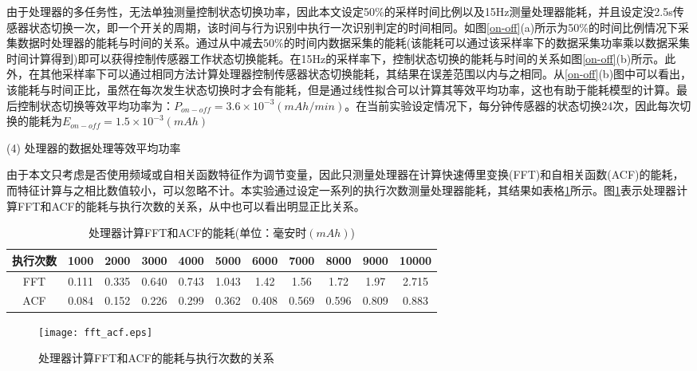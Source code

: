 \par 由于处理器的多任务性，无法单独测量控制状态切换功率，因此本文设定50\%的采样时间比例以及15Hz测量处理器能耗，并且设定没2.5s传感器状态切换一次，即一个开关的周期，该时间与行为识别中执行一次识别判定的时间相同。如图\ref{on-off}(a)所示为50\%的时间比例情况下采集数据时处理器的能耗与时间的关系。通过从中减去50\%的时间内数据采集的能耗(该能耗可以通过该采样率下的数据采集功率乘以数据采集时间计算得到)即可以获得控制传感器工作状态切换能耗。在15Hz的采样率下，控制状态切换的能耗与时间的关系如图\ref{on-off}(b)所示。此外，在其他采样率下可以通过相同方法计算处理器控制传感器状态切换能耗，其结果在误差范围以内与之相同。从\ref{on-off}(b)图中可以看出，该能耗与时间正比，虽然在每次发生状态切换时才会有能耗，但是通过线性拟合可以计算其等效平均功率，这也有助于能耗模型的计算。最后控制状态切换等效平均功率为：$P_{on-off} = 3.6 \times 10^{-3} (mAh/min)$。在当前实验设定情况下，每分钟传感器的状态切换24次，因此每次切换的能耗为$E_{on-off} = 1.5 \times 10^{-3}(mAh)$

	(4) 处理器的数据处理等效平均功率

\par 由于本文只考虑是否使用频域或自相关函数特征作为调节变量，因此只测量处理器在计算快速傅里变换(FFT)和自相关函数(ACF)的能耗，而特征计算与之相比数值较小，可以忽略不计。本实验通过设定一系列的执行次数测量处理器能耗，其结果如表格\ref{compute_energy}所示。图\ref{fft_acf}表示处理器计算FFT和ACF的能耗与执行次数的关系，从中也可以看出明显正比关系。

\begin{table}[htb]
    \centering
    \caption{处理器计算FFT和ACF的能耗(单位：毫安时$(mAh)$)}\label{compute_energy}
    \begin{tabular}{ccccccccccc}
    \toprule
    执行次数 & 1000 & 2000 & 3000 & 4000 & 5000 & 6000 & 7000 & 8000 & 9000 & 10000 \\
    \midrule
    FFT & 0.111 & 0.335 & 0.640 & 0.743 & 1.043 & 1.42 & 1.56 & 1.72 & 1.97 & 2.715 \\
    ACF & 0.084 & 0.152 & 0.226 & 0.299 & 0.362 & 0.408 & 0.569 & 0.596 & 0.809 & 0.883 \\
    \bottomrule
    \end{tabular}
 \end{table}

\begin{figure}[htb]
\centering
\texttt{[image: fft\_acf.eps]}
\caption{处理器计算FFT和ACF的能耗与执行次数的关系}\label{fft_acf}
\end{figure}

